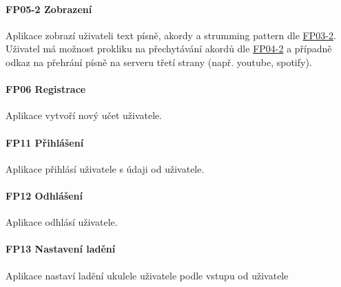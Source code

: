 \noindent \begin{minipage}{\textwidth}
    \paragraph{FP05-2 Zobrazení} \label{FP05-2}
    \begin{smallindent}{}
        Aplikace zobrazí uživateli text písně, akordy a strumming pattern dle \hyperref[FP03-2]{FP03-2}. Uživatel má možnost prokliku na přechytávání akordů dle \hyperref[FP04-2]{FP04-2} a případně odkaz na přehrání písně na serveru třetí strany (např. youtube, spotify).
    \end{smallindent}
\end{minipage}

\noindent \begin{minipage}{\textwidth}
    \paragraph{FP06 Registrace} \label{FP06}
    \begin{smallindent}{}
        Aplikace vytvoří nový učet uživatele.
    \end{smallindent}
\end{minipage}

\noindent \begin{minipage}{\textwidth}
    \paragraph{FP11 Přihlášení} \label{FP11}
    \begin{smallindent}{}
        Aplikace přihlásí uživatele s údaji od uživatele.
    \end{smallindent}
\end{minipage}

\noindent \begin{minipage}{\textwidth}
    \paragraph{FP12 Odhlášení} \label{FP12}
    \begin{smallindent}{}
        Aplikace odhlásí uživatele.
    \end{smallindent}
\end{minipage}

\noindent \begin{minipage}{\textwidth}
    \paragraph{FP13 Nastavení ladění} \label{FP12}
    \begin{smallindent}{}
        Aplikace nastaví ladění ukulele uživatele podle vstupu od uživatele
    \end{smallindent}
\end{minipage}

